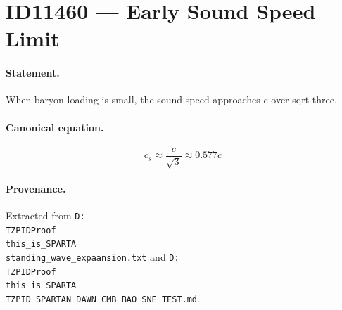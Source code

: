 \section*{ID11460 --- Early Sound Speed Limit}

\paragraph{Statement.}
When baryon loading is small, the sound speed approaches c over sqrt three.

\paragraph{Canonical equation.}
\[
c_s\approx\frac{c}{\sqrt3}\approx0.577c
\]

\paragraph{Provenance.}
Extracted from \texttt{D:\\TZPIDProof\\this\_is\_SPARTA\\standing\_wave\_expaansion.txt} and \texttt{D:\\TZPIDProof\\this\_is\_SPARTA\\TZPID\_SPARTAN\_DAWN\_CMB\_BAO\_SNE\_TEST.md}.
